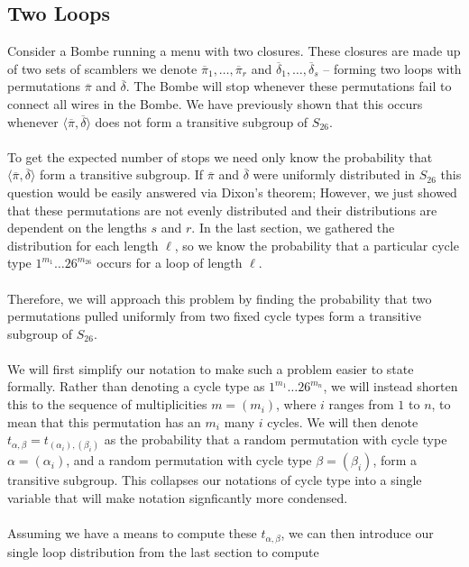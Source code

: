 \subsection{Two Loops}
Consider a Bombe running a menu with two closures. These closures are made up of two sets of scamblers we denote $\overline\pi_1, \dots, \overline\pi_r$ and $\overline\delta_1,\dots,\overline\delta_s$ -- forming two loops with permutations $\overline\pi$ and $\overline\delta$. The Bombe will stop whenever these permutations fail to connect all wires in the Bombe. We have previously shown that this occurs whenever $\langle \overline\pi, \overline\delta \rangle$ does not form a transitive subgroup of $S_{26}$.
\\\\To get the expected number of stops we need only know the probability that $\langle \overline\pi, \overline\delta \rangle$ form a transitive subgroup. If $\overline\pi$ and $\overline\delta$ were uniformly distributed in $S_{26}$ this question would be easily answered via Dixon's theorem; However, we just showed that these permutations are not evenly distributed and their distributions are dependent on the lengths $s$ and $r$. In the last section, we gathered the distribution for each length $\ell$, so we know the probability that a particular cycle type $1^{m_1}\dots26^{m_{26}}$ occurs for a loop of length $\ell$.
\\\\Therefore, we will approach this problem by finding the probability that two permutations pulled uniformly from two fixed cycle types form a transitive subgroup of $S_{26}$.
\\\\We will first simplify our notation to make such a problem easier to state formally. Rather than denoting a cycle type as $1^{m_1}\dots26^{m_{n}}$, we will instead shorten this to the sequence of multiplicities $m=(m_i)$, where $i$ ranges from $1$ to $n$, to mean that this permutation has an $m_i$ many $i$ cycles. We will then denote $t_{\alpha, \beta} =t_{(\alpha_i), (\beta_i)}$ as the probability that a random permutation with cycle type $\alpha =(\alpha_i)$, and a random permutation with cycle type $\beta = (\beta_i)$, form a transitive subgroup. This collapses our notations of cycle type into a single variable that will make notation signficantly more condensed. 
\\\\Assuming we have a means to compute these $t_{\alpha, \beta}$, we can then introduce our single loop distribution from the last section to compute
